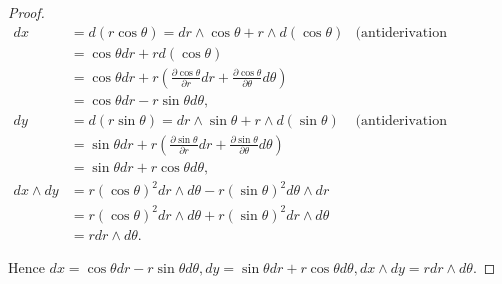 \begin{proof}
    \begingroup
    \allowdisplaybreaks%
    \begin{align*}
        dx           & = d(r\cos\theta) = dr \wedge \cos\theta + r\wedge d(\cos\theta)                                                                 & \text{(antiderivation property)} \\
                     & = \cos\theta dr + r d(\cos\theta)                                                                                                                                  \\
                     & = \cos\theta dr + r \left(\frac{\partial \cos\theta}{\partial r} dr + \frac{\partial \cos\theta}{\partial \theta}d\theta\right)                                    \\
                     & = \cos\theta dr - r\sin\theta d\theta,                                                                                                                             \\
        dy           & = d(r\sin\theta) = dr \wedge \sin\theta + r\wedge d(\sin\theta)                                                                 & \text{(antiderivation property)} \\
                     & = \sin\theta dr + r\left(\frac{\partial \sin\theta}{\partial r} dr + \frac{\partial \sin\theta}{\partial\theta} d\theta\right)                                     \\
                     & = \sin\theta dr + r\cos\theta d\theta,                                                                                                                             \\
        dx \wedge dy & = r{(\cos\theta)}^{2} dr \wedge d\theta - r{(\sin\theta)}^{2} d\theta \wedge dr                                                                                    \\
                     & = r{(\cos\theta)}^{2} dr \wedge d\theta + r{(\sin\theta)}^{2} dr \wedge d\theta                                                                                    \\
                     & = r dr \wedge d\theta.
    \end{align*}
    \endgroup

    Hence \( dx = \cos\theta dr - r\sin\theta d\theta, dy = \sin\theta dr + r\cos\theta d\theta, dx \wedge dy = rdr \wedge d\theta \).
\end{proof}

